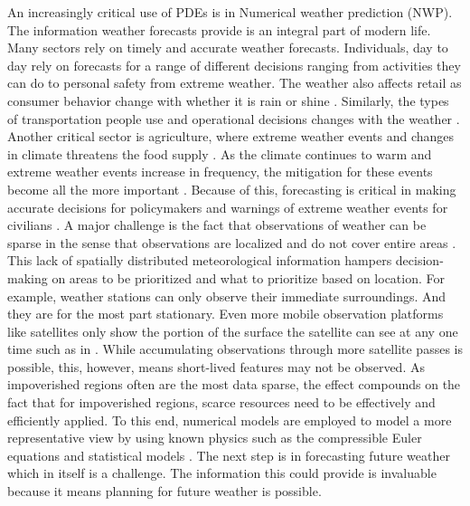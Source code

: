 An increasingly critical use of PDEs is in Numerical weather prediction (NWP). The information weather forecasts provide is an integral part of modern life. Many sectors rely on timely and accurate weather forecasts. Individuals, day to day rely on forecasts for a range of different decisions ranging from activities they can do to personal safety from extreme weather. The weather also affects retail as consumer behavior change with whether it is rain or shine \autocite{tianImpactWeatherConsumer2021,tianPredictingConsumerVarietyseeking2018,govindWeatherAffectPreference2020,moonWeatherSensitivityAnalysis2018}. Similarly, the types of transportation people use and operational decisions changes with the weather \autocite{lepageImpactWeatherActivities2021,nurmiExpectedImpactsValue2013}. Another critical sector is agriculture, where extreme weather events and changes in climate threatens the food supply \autocite{cogatoExtremeWeatherEvents2019,malhiImpactClimateChange2021,anwarAdaptingAgricultureClimate2013}. As the climate continues to warm and extreme weather events increase in frequency, the mitigation for these events become all the more important \autocite{ClimateChange20222023}. Because of this, forecasting is critical in making accurate decisions for policymakers and warnings of extreme weather events for civilians \autocite{astithaExtremeWeatherForecasting2023,stottAttributionExtremeWeather2016}. A major challenge is the fact that observations of weather can be sparse in the sense that observations are localized and do not cover entire areas \autocite{wilbyRainfallTemperatureEstimation2013,monmonierAirApparentHow1999,galkinAssimilationSparseContinuous2020}. This lack of spatially distributed meteorological information hampers decision-making on areas to be prioritized and what to prioritize based on location. For example, weather stations can only observe their immediate surroundings. And they are for the most part stationary. Even more mobile observation platforms like satellites only show the portion of the surface the satellite can see at any one time such as in . While accumulating observations through more satellite passes is possible, this, however, means short-lived features may not be observed. As impoverished regions often are the most data sparse, the effect compounds on the fact that for impoverished regions, scarce resources need to be effectively and efficiently applied. To this end, numerical models are employed to model a more representative view by using known physics such as the compressible Euler equations and statistical models \autocite{mengaldoCurrentEmergingTimeIntegration2019,kwasniokDatabasedStochasticSubgridscale2012}. The next step is in forecasting future weather which in itself is a challenge. The information this could provide is invaluable because it means planning for future weather is possible.

